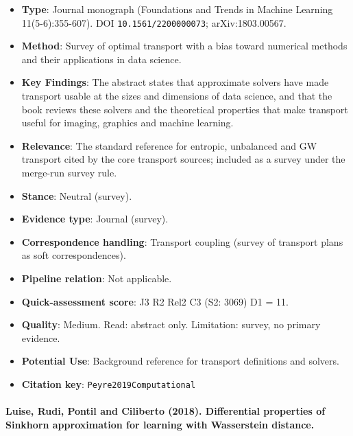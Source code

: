 \documentclass[journal,onecolumn]{IEEEtran}
\begin{document}
\begin{itemize}

\item{} \textbf{Type}: Journal monograph (Foundations and Trends in Machine Learning 11(5-6):355-607). DOI \nolinkurl{10.1561/2200000073}; arXiv:1803.00567.

\item{} \textbf{Method}: Survey of optimal transport with a bias toward numerical methods and their applications in data science.

\item{} \textbf{Key Findings}: The abstract states that approximate solvers have made transport usable at the sizes and dimensions of data science, and that the book reviews these solvers and the theoretical properties that make transport useful for imaging, graphics and machine learning.

\item{} \textbf{Relevance}: The standard reference for entropic, unbalanced and GW transport cited by the core transport sources; included as a survey under the merge-run survey rule.

\item{} \textbf{Stance}: Neutral (survey).

\item{} \textbf{Evidence type}: Journal (survey).

\item{} \textbf{Correspondence handling}: Transport coupling (survey of transport plans as soft correspondences).

\item{} \textbf{Pipeline relation}: Not applicable.

\item{} \textbf{Quick-assessment score}: J3 R2 Rel2 C3 (S2: 3069) D1 = 11.

\item{} \textbf{Quality}: Medium. Read: abstract only. Limitation: survey, no primary evidence.

\item{} \textbf{Potential Use}: Background reference for transport definitions and solvers.

\item{} \textbf{Citation key}: \texttt{Peyre2019Computational}

\end{itemize}

\paragraph{Luise, Rudi, Pontil and Ciliberto (2018). Differential properties of Sinkhorn approximation for learning with Wasserstein distance.~\cite{Luise2018Differential}}\mbox{}
\end{document}
